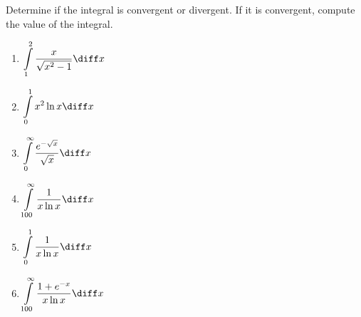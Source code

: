 Determine if the integral is convergent or divergent. If it is convergent, compute the value of the integral.

\begin{enumerate}
\item $\displaystyle \int\limits_{1}^{2} \frac{x}{\sqrt{x^2-1}}\diff x$ 
\item $\displaystyle \int\limits_{0}^{1} x^2\ln x\diff x$ 
\item $\displaystyle \int\limits_{0}^{\infty} \frac{e^{-\sqrt{x}}}{ \sqrt{x}} \diff x $
\item $\displaystyle \int\limits_{100}^{\infty} \frac{1}{x\ln x}\diff x $
\item $\displaystyle \int\limits_{0}^{1} \frac{1}{x\ln x}\diff x $
\item $\displaystyle \int\limits_{100}^{\infty} \frac{1+e^{-x}}{x\ln x }\diff x $ 
\end{enumerate}